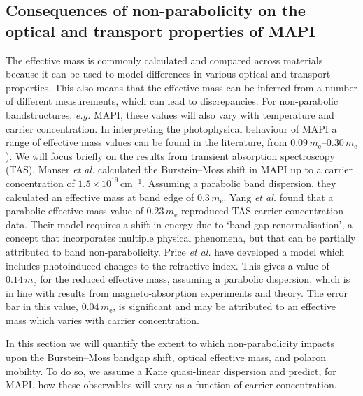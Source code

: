 \subsection[Consequences of non-parabolicity on optical and transport properties]{Consequences of non-parabolicity on the optical and transport properties of MAPI}

The effective mass is commonly calculated and compared across materials because it can be used to model differences in various optical and transport properties.
This also means that the effective mass can be inferred from a number of different measurements, which can lead to discrepancies.
For non-parabolic bandstructures, \textit{e.g.} MAPI, these values will also vary with temperature and carrier concentration.
In interpreting the photophysical behaviour of MAPI a range of effective mass values can be found in the literature, from $0.09\,m_{\text{e}}$--$0.30\,m_{\text{e}}$).\autocite{Miyata2015,Tanaka2003,Hirasawa1994,Yang2015,Manser2014,Price2015}
We will focus briefly on the results from transient absorption spectroscopy (TAS).
Manser \textit{et al.} calculated the Burstein--Moss shift in MAPI up to a carrier concentration of $1.5 \times 10^{19}\,\mathrm{cm}^{-1}$.\autocite{Manser2014} Assuming a parabolic band dispersion, they calculated an effective mass at band edge of $0.3\,m_{\text{e}}$.
Yang \textit{et al.} found that a parabolic effective mass value of $0.23\,m_{\text{e}}$ reproduced TAS carrier concentration data.\autocite{Yang2015} Their model requires a shift in energy due to `band gap renormalisation', a concept that incorporates multiple physical phenomena, but that can be partially attributed to band non-parabolicity.\autocite{Walsh2008}
Price \textit{et al.} have developed a model which includes photoinduced changes to the refractive index.\autocite{Price2015} This gives a value of $0.14\,m_{\text{e}}$ for the reduced effective mass, assuming a parabolic dispersion, which is in line with results from magneto-absorption experiments\autocite{Miyata2015,Tanaka2003,Hirasawa1994} and theory.\autocite{Brivio2014,Umari2014} 
The error bar in this value, $0.04\,m_{\text{e}}$, is significant and may be attributed to an effective mass which varies with carrier concentration.

In this section we will quantify the extent to which non-parabolicity impacts upon the Burstein--Moss bandgap shift, optical effective mass, and polaron mobility.
To do so, we assume a Kane quasi-linear dispersion and predict, for MAPI, how these observables will vary as a function of carrier concentration.

